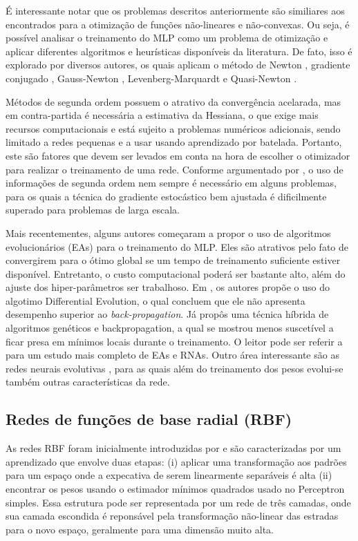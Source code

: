 \documentclass[conference]{IEEEtran}
\begin{document}
	É interessante notar que os problemas descritos anteriormente são similiares aos encontrados para a otimização de funções não-lineares e não-convexas. Ou seja, é possível analisar o treinamento do MLP como um problema de otimização e aplicar diferentes algoritmos e heurísticas disponíveis da literatura. De fato, isso é explorado por diversos autores, os quais aplicam o método de Newton \cite{becker1988improving}, gradiente conjugado \cite{johansson1991backpropagation}, Gauss-Newton \cite{battiti1992first}, Levenberg-Marquardt \cite{hagan1994training} e Quasi-Newton \cite{robitaille1996modified}.  
	
	Métodos de segunda ordem possuem o atrativo da convergência acelarada, mas em contra-partida é necessária a estimativa da Hessiana, o que exige mais recursos computacionais e está sujeito a problemas numéricos adicionais, sendo limitado a redes pequenas e a usar usando aprendizado por batelada. Portanto, este são fatores que devem ser levados em conta na hora de escolher o otimizador para realizar o treinamento de uma rede. Conforme argumentado por \cite{lecun2012efficient}, o uso de informações de segunda ordem nem sempre é necessário em alguns problemas, para os quais a técnica do gradiente estocástico bem ajustada é dificilmente superado para problemas de larga escala.
	
	Mais recentementes, alguns autores começaram a propor o uso de algoritmos evolucionários (EAs) para o treinamento do MLP. Eles são atrativos pelo fato de convergirem para o ótimo global se um tempo de treinamento suficiente estiver disponível. Entretanto, o custo computacional poderá ser bastante alto, além do ajuste dos hiper-parâmetros ser trabalhoso. Em \cite{ilonen2003differential}, os autores propõe o uso do algotimo Differential Evolution, o qual concluem que ele não apresenta desempenho superior ao \textit{back-propagation}. Já \cite{ding2011optimizing} propôs uma técnica híbrida de algoritmos genéticos e backpropagation, a qual se mostrou menos suscetível a ficar presa em mínimos locais durante o treinamento. O leitor pode ser referir a \cite{mirjalili2019evolutionary} para um estudo mais completo de EAs e RNAs. Outro área interessante são as redes neurais evolutivas \cite{yao1999evolving}, para as quais além do treinamento dos pesos evolui-se também outras características da rede.
	
	\subsection{Redes de funções de base radial (RBF)}
	As redes RBF foram inicialmente introduzidas por \cite{broomhead1988multivariablefi} e são caracterizadas por um aprendizado que envolve duas etapas: (i) aplicar uma transformação aos padrões para um espaço onde a expecativa de serem linearmente separáveis é alta (ii) encontrar os pesos usando o estimador mínimos quadrados usado no Perceptron simples. Essa estrutura pode ser representada por um rede de três camadas, onde sua camada escondida é reponsável pela transformação não-linear das estradas para o novo espaço, geralmente para uma dimensão muito alta. 
	
\end{document}
